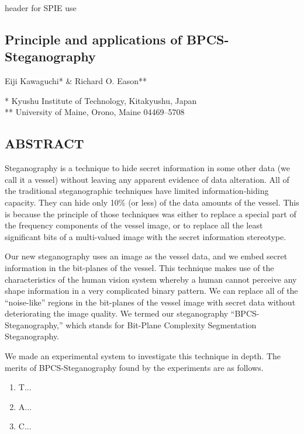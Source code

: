 \documentclass{article}
\begin{document}
\newpage


header for SPIE use

\begin{center}

\section*{Principle and applications of BPCS-Steganography}

Eiji Kawaguchi* \& Richard O. Eason**

* Kyushu Institute of Technology, Kitakyushu, Japan \\
** University of Maine, Orono, Maine 04469--5708

\subsection*{ABSTRACT}

Steganography is a technique to hide secret information in some other data (we call it a vessel) without leaving any apparent evidence of data alteration. All of the traditional steganographic techniques have limited information-hiding capacity. They can hide only 10\% (or less) of the data amounts of the vessel. This is because the principle of those techniques was either to replace a special part of the frequency components of the vessel image, or to replace all the least significant bits of a multi-valued image with the secret information stereotype.

Our new steganography uses an image as the vessel data, and we embed secret information in the bit-planes of the vessel. This technique makes use of the characteristics of the human vision system whereby a human cannot perceive any shape information in a very complicated binary pattern. We can replace all of the ``noise-like'' regions in the bit-planes of the vessel image with secret data without deteriorating the image quality. We termed our steganography ``BPCS-Steganography,'' which stands for Bit-Plane Complexity Segmentation Steganography.

We made an experimental system to investigate this technique in depth. The merits of BPCS-Steganography found by the experiments are as follows.

\begin{enumerate}
  \item T...
  \item A...
  \item C...
\end{enumerate}
\end{center}
\end{document}
